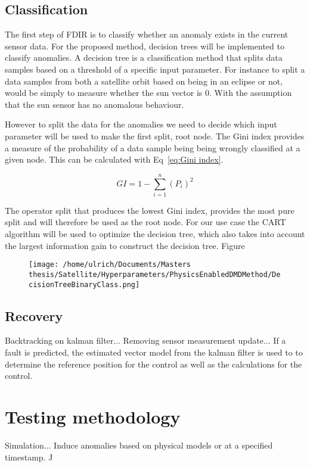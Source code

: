 \documentclass[letterpaper, 10 pt, conference]{ieeeconf}  %
\begin{document}
\subsection{Classification}
The first step of FDIR is to classify whether an anomaly exists in the current sensor data. For the proposed method, decision trees will be implemented to classify anomalies. A decision tree is a classification method that splits data samples based on a threshold of a specific input parameter. For instance to split a data samples from both a satellite orbit based on being in an eclipse or not, would be simply to measure whether the sun vector is $0$. With the assumption that the sun sensor has no anomalous behaviour.

However to split the data for the anomalies we need to decide which input parameter will be used to make the first split, root node. The Gini index provides a measure of the probability of a data sample being being wrongly classified at a given node. This can be calculated with Eq~\ref{eq:Gini index}.

\begin{equation}
GI = 1 - \sum_{i = 1}^{n}{(P_i)^2}
\label{eq:Gini index}
\end{equation}

The operator split that produces the lowest Gini index, provides the most pure split and will therefore be used as the root node. For our use case the CART algorithm will be used to optimize the decision tree, which also takes into account the largest information gain to construct the decision tree. Figure

\begin{figure}[!htb]
\texttt{[image: /home/ulrich/Documents/Masters thesis/Satellite/Hyperparameters/PhysicsEnabledDMDMethod/DecisionTreeBinaryClass.png]}
\end{figure}


\subsection{Recovery}
Backtracking on kalman filter... Removing sensor measurement update... If a fault is predicted, the estimated vector model from the kalman filter is used to to determine the reference position for the control as well as the calculations for the control.

\section{Testing methodology}
Simulation... Induce anomalies based on physical models or at a specified timestamp. J
\end{document}
